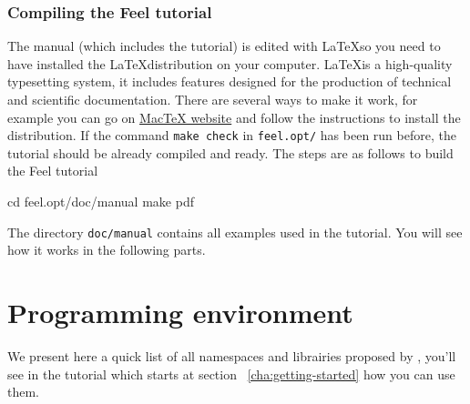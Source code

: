 


\subsubsection{Compiling the Feel tutorial}
\label{sec:comp-feel-tutor}
The manual (which includes the tutorial) is edited with \LaTeX  so you need to have installed the \LaTeX  distribution on your computer. \LaTeX  is a high-quality typesetting system, it includes features designed for the production of technical and scientific documentation. There are several ways to make it work, for example you can go on \href{http://www.tug.org/mactex/}{MacTeX website} and follow the instructions to install the distribution. If the command \verb|make check| in \verb|feel.opt/| has been run before, the tutorial
should be already compiled and ready. The steps are as follows to build the Feel tutorial
\begin{unixcom}
  cd feel.opt/doc/manual
  make pdf
\end{unixcom}
%
The directory \verb|doc/manual| contains all examples used in the tutorial. You will see how it works in the following parts.

\section{Programming environment}
\label{sec:progr-envir}
We present here a quick list of all namespaces and librairies proposed by \feel, you'll see in the tutorial which starts at section ~\ref{cha:getting-started} how you can use them.

